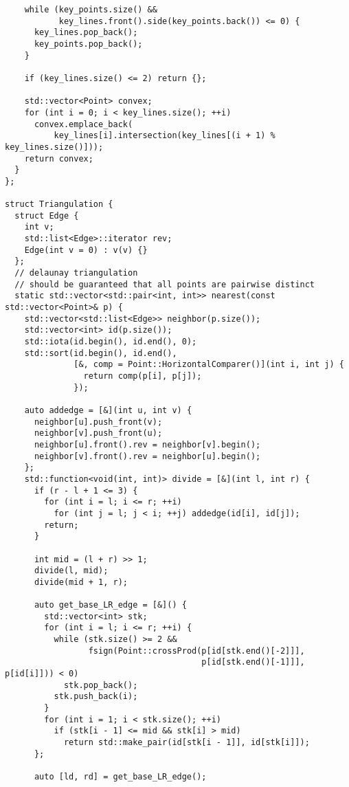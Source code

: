 \documentclass{article}
\begin{document}
\begin{multicols}{2}
\begin{lstlisting}
    while (key_points.size() &&
           key_lines.front().side(key_points.back()) <= 0) {
      key_lines.pop_back();
      key_points.pop_back();
    }

    if (key_lines.size() <= 2) return {};

    std::vector<Point> convex;
    for (int i = 0; i < key_lines.size(); ++i)
      convex.emplace_back(
          key_lines[i].intersection(key_lines[(i + 1) % key_lines.size()]));
    return convex;
  }
};

struct Triangulation {
  struct Edge {
    int v;
    std::list<Edge>::iterator rev;
    Edge(int v = 0) : v(v) {}
  };
  // delaunay triangulation
  // should be guaranteed that all points are pairwise distinct
  static std::vector<std::pair<int, int>> nearest(const std::vector<Point>& p) {
    std::vector<std::list<Edge>> neighbor(p.size());
    std::vector<int> id(p.size());
    std::iota(id.begin(), id.end(), 0);
    std::sort(id.begin(), id.end(),
              [&, comp = Point::HorizontalComparer()](int i, int j) {
                return comp(p[i], p[j]);
              });

    auto addedge = [&](int u, int v) {
      neighbor[u].push_front(v);
      neighbor[v].push_front(u);
      neighbor[u].front().rev = neighbor[v].begin();
      neighbor[v].front().rev = neighbor[u].begin();
    };
    std::function<void(int, int)> divide = [&](int l, int r) {
      if (r - l + 1 <= 3) {
        for (int i = l; i <= r; ++i)
          for (int j = l; j < i; ++j) addedge(id[i], id[j]);
        return;
      }

      int mid = (l + r) >> 1;
      divide(l, mid);
      divide(mid + 1, r);

      auto get_base_LR_edge = [&]() {
        std::vector<int> stk;
        for (int i = l; i <= r; ++i) {
          while (stk.size() >= 2 &&
                 fsign(Point::crossProd(p[id[stk.end()[-2]]],
                                        p[id[stk.end()[-1]]], p[id[i]])) < 0)
            stk.pop_back();
          stk.push_back(i);
        }
        for (int i = 1; i < stk.size(); ++i)
          if (stk[i - 1] <= mid && stk[i] > mid)
            return std::make_pair(id[stk[i - 1]], id[stk[i]]);
      };

      auto [ld, rd] = get_base_LR_edge();


\end{lstlisting}
\end{multicols}
\end{document}

